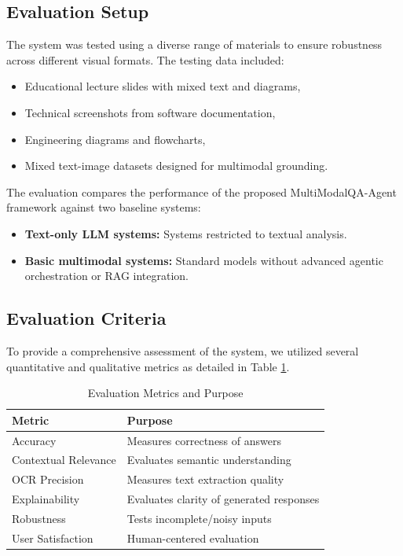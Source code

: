 \documentclass[conference]{IEEEtran}
\begin{document}
\subsection{Evaluation Setup}
The system was tested using a diverse range of materials to ensure robustness across different visual formats. The testing data included:
\begin{itemize}
    \item Educational lecture slides with mixed text and diagrams,
    \item Technical screenshots from software documentation,
    \item Engineering diagrams and flowcharts,
    \item Mixed text-image datasets designed for multimodal grounding.
\end{itemize}

The evaluation compares the performance of the proposed MultiModalQA-Agent framework against two baseline systems:
\begin{itemize}
    \item \textbf{Text-only LLM systems:} Systems restricted to textual analysis.
    \item \textbf{Basic multimodal systems:} Standard models without advanced agentic orchestration or RAG integration.
\end{itemize}

\subsection{Evaluation Criteria}
To provide a comprehensive assessment of the system, we utilized several quantitative and qualitative metrics as detailed in Table \ref{tab:metrics}.

\begin{table}[htbp]
\centering
\caption{Evaluation Metrics and Purpose}
\label{tab:metrics}
\begin{tabular}{|l|l|}
\hline
\textbf{Metric} & \textbf{Purpose} \\ \hline
Accuracy & Measures correctness of answers \\ \hline
Contextual Relevance & Evaluates semantic understanding \\ \hline
OCR Precision & Measures text extraction quality \\ \hline
Explainability & Evaluates clarity of generated responses \\ \hline
Robustness & Tests incomplete/noisy inputs \\ \hline
User Satisfaction & Human-centered evaluation \\ \hline
\end{tabular}
\end{table}
\end{document}
